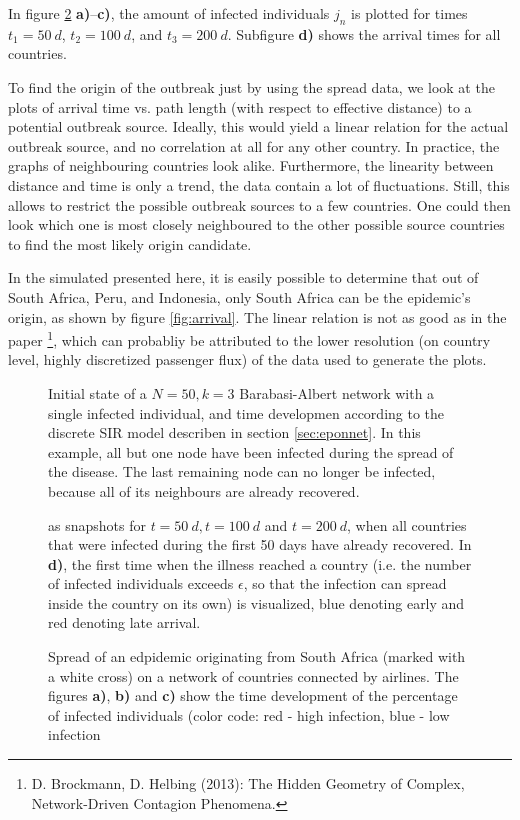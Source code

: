 \documentclass{scrartcl}
\begin{document}
In figure \ref{fig:D1spread} \textbf{a)}--\textbf{c)}, the amount of infected individuals $j_n$ is plotted for times $t_1=\SI{50}{d}$, $t_2 = \SI{100}{d}$, and $t_3 = \SI{200}{d}$. Subfigure \textbf{d)} shows the arrival times for all countries.

To find the origin of the outbreak just by using the spread data, we look at the plots of arrival time vs. path length (with respect to effective distance) to a potential outbreak source. 
Ideally, this would yield a linear relation for the actual outbreak source, and no correlation at all for any other country. In practice, the graphs of neighbouring countries look alike. 
Furthermore, the linearity between distance and time is only a trend, the data contain a lot of fluctuations.
Still, this allows to restrict the possible outbreak sources to a few countries. One could then look which one is most closely neighboured to the other possible source countries to find the most likely origin candidate.

In the simulated presented here, it is easily possible to determine that out of South Africa, Peru, and Indonesia, only South Africa can be the epidemic's origin, as shown by figure \ref{fig:arrival}. The linear relation is not as good as in the paper \footnote{D. Brockmann, D. Helbing (2013): The Hidden Geometry of Complex, Network-Driven Contagion Phenomena.}, which can probabliy be attributed to the lower resolution (on country level, highly discretized passenger flux) of the data used to generate the plots.

\begin{figure}
    \centering
    \def\svgwidth{0.9\textwidth}
    
    \caption{Initial state of a $N=50, k=3$ Barabasi-Albert network with a single infected individual, and time developmen according to the discrete SIR model describen in section \ref{sec:eponnet}. In this example, all but one node have been infected during the spread of the disease. The last remaining node can no longer be infected, because all of its neighbours are already recovered.}
    \label{fig:D11}
\end{figure}


\begin{figure}
    \centering
    \def\svgwidth{1.0\textwidth}
    
    \caption{Spread of an edpidemic originating from South Africa (marked with a white cross) on a network of countries connected by airlines. The figures \textbf{a)}, \textbf{b)} and \textbf{c)} show the time development of the percentage of infected individuals (color code: red - high infection, blue - low infection} as snapshots for $t=\SI{50}{d}, t=\SI{100}{d}$ and $t=\SI{200}{d}$, when all countries that were infected during the first 50 days have already recovered.
		In \textbf{d)}, the first time when the illness reached a country (i.e. the number of infected individuals exceeds $\epsilon$, so that the infection can spread inside the country on its own) is visualized, blue denoting early and red denoting late arrival. 
    \label{fig:D1spread}
\end{figure}
\end{document}
